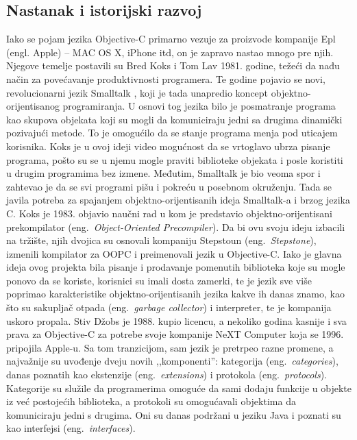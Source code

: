 \documentclass[a4paper]{article}
\begin{document}
\subsection{Nastanak i istorijski razvoj}
\label{subsec:istorija}
Iako se pojam jezika Objective-C primarno vezuje za proizvode kompanije Epl (engl. Apple) -- MAC OS X, iPhone itd, on je zapravo nastao mnogo pre njih. Njegove temelje postavili su Bred Koks i Tom Lav 1981. godine, težeći da nađu način za povećavanje produktivnosti programera. Te godine pojavio se novi, revolucionarni jezik Smalltalk \cite{smalltalk}, koji je tada unapredio koncept objektno-orijentisanog programiranja. U osnovi tog jezika bilo je posmatranje programa kao skupova objekata koji su mogli da komuniciraju jedni sa drugima dinamički pozivajući metode. To je omogućilo da se stanje programa menja pod uticajem korisnika. Koks je u ovoj ideji video mogućnost da se vrtoglavo ubrza pisanje programa, pošto su se u njemu mogle praviti biblioteke objekata i posle koristiti u drugim programima bez izmene. Međutim, Smalltalk je bio veoma spor i zahtevao je da se svi programi pišu i pokreću u posebnom okruženju. Tada se javila potreba za spajanjem objektno-orijentisanih ideja Smalltalk-a i brzog jezika C. Koks je 1983. objavio naučni rad u kom je predstavio objektno-orijentisani prekompilator (eng.~{\em Object-Oriented Precompiler}). Da bi ovu svoju ideju izbacili na tržište, njih dvojica su osnovali kompaniju Stepstoun (eng.~{\em Stepstone}), izmenili kompilator za OOPC i preimenovali jezik u Objective-C. Iako je glavna ideja ovog projekta bila pisanje i prodavanje pomenutih biblioteka koje su mogle ponovo da se koriste, korisnici su imali dosta zamerki, te je jezik sve više poprimao karakteristike objektno-orijentisanih jezika kakve ih danas znamo, kao što su sakupljač otpada (eng.~{\em garbage collector}) i interpreter, te je kompanija uskoro propala. Stiv Džobs je 1988. kupio licencu, a nekoliko godina kasnije i sva prava za Objective-C za potrebe svoje kompanije NeXT Computer koja se  1996. pripojila Apple-u. Sa tom tranzicijom, sam jezik je pretrpeo razne promene, a najvažnije su uvođenje dveju novih ,,komponenti'': kategorija (eng.~{\em categories}), danas poznatih kao ekstenzije (eng.~{\em extensions}) i protokola (eng.~{\em protocols}). Kategorije su služile da programerima omoguće da sami dodaju funkcije u objekte iz već postojećih biblioteka, a protokoli su omogućavali objektima da komuniciraju jedni s drugima. Oni su danas podržani u jeziku Java i poznati su kao interfejsi (eng.~{\em interfaces}). 
\end{document}
